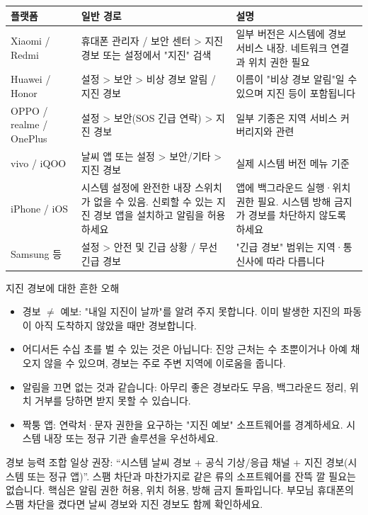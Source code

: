 \begin{center}
\begin{tabularx}{\linewidth}{|X|X|X|}
\hline
\textbf{플랫폼} & \textbf{일반 경로} & \textbf{설명} \tabularnewline
\hline
Xiaomi / Redmi & 휴대폰 관리자 / 보안 센터 > 지진 경보 또는 설정에서 "지진" 검색 & 일부 버전은 시스템에 경보 서비스 내장. 네트워크 연결과 위치 권한 필요 \tabularnewline
Huawei / Honor & 설정 > 보안 > 비상 경보 알림 / 지진 경보 & 이름이 "비상 경보 알림"일 수 있으며 지진 등이 포함됩니다 \tabularnewline
OPPO / realme / OnePlus & 설정 > 보안(SOS 긴급 연락) > 지진 경보 & 일부 기종은 지역 서비스 커버리지와 관련 \tabularnewline
vivo / iQOO & 날씨 앱 또는 설정 > 보안/기타 > 지진 경보 & 실제 시스템 버전 메뉴 기준 \tabularnewline
iPhone / iOS & 시스템 설정에 완전한 내장 스위치가 없을 수 있음. 신뢰할 수 있는 지진 경보 앱을 설치하고 알림을 허용하세요 & 앱에 백그라운드 실행·위치 권한 필요. 시스템 방해 금지가 경보를 차단하지 않도록 하세요 \tabularnewline
Samsung 등 & 설정 > 안전 및 긴급 상황 / 무선 긴급 경보 & "긴급 경보" 범위는 지역·통신사에 따라 다릅니다 \tabularnewline
\hline
\end{tabularx}
\end{center}

\begin{tcbwarn}{지진 경보에 대한 흔한 오해}
\begin{itemize}
  \item 경보 $\neq$ 예보: "내일 지진이 날까"를 알려 주지 못합니다. 이미 발생한 지진의 파동이 아직 도착하지 않았을 때만 경보합니다.
  \item 어디서든 수십 초를 벌 수 있는 것은 아닙니다: 진앙 근처는 수 초뿐이거나 아예 채 오지 않을 수 있으며, 경보는 주로 주변 지역에 이로움을 줍니다.
  \item 알림을 끄면 없는 것과 같습니다: 아무리 좋은 경보라도 무음, 백그라운드 정리, 위치 거부를 당하면 받지 못할 수 있습니다.
  \item 짝퉁 앱: 연락처·문자 권한을 요구하는 "지진 예보" 소프트웨어를 경계하세요. 시스템 내장 또는 정규 기관 솔루션을 우선하세요.
\end{itemize}

\end{tcbwarn}

\begin{tcbinfo}{경보 능력 조합}
일상 권장: “시스템 날씨 경보 + 공식 기상/응급 채널 + 지진 경보(시스템 또는 정규 앱)”. 스팸 차단과 마찬가지로 같은 류의 소프트웨어를 잔뜩 깔 필요는 없습니다. 핵심은 알림 권한 허용, 위치 허용, 방해 금지 돌파입니다. 부모님 휴대폰의 스팸 차단을 켰다면 날씨 경보와 지진 경보도 함께 확인하세요.

\end{tcbinfo}

